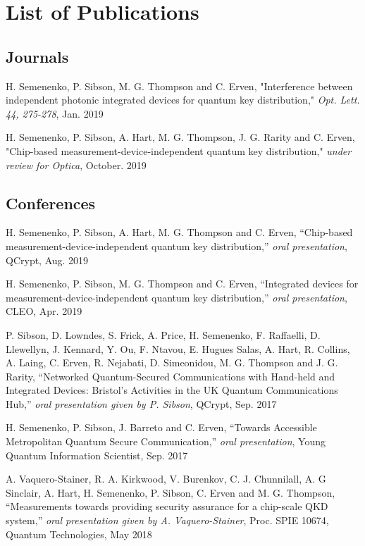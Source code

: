 %
{\setlength{\parindent}{0pt} %
\abnormalparskip{18pt} %
\chapter*{List of Publications}
\section*{Journals}

H. Semenenko, P. Sibson, M. G. Thompson and C. Erven, "Interference between independent photonic integrated devices for quantum key distribution," \textit{Opt. Lett. 44, 275-278}, Jan. 2019 

H. Semenenko, P. Sibson, A. Hart, M. G. Thompson, J. G. Rarity  and C. Erven, "Chip-based measurement-device-independent quantum key distribution," \textit{under review for Optica}, October. 2019 

\section*{Conferences}

H. Semenenko, P. Sibson, A. Hart, M. G. Thompson and C. Erven, ``Chip-based measurement-device-independent quantum key distribution,'' \textit{oral presentation}, QCrypt, Aug. 2019

H. Semenenko, P. Sibson, M. G. Thompson and C. Erven, ``Integrated devices for measurement-device-independent quantum key distribution,'' \textit{oral presentation}, CLEO, Apr. 2019

P. Sibson, D. Lowndes, S. Frick, A. Price, H. Semenenko, F. Raffaelli, D. Llewellyn, J. Kennard, Y. Ou, F. Ntavou, E. Hugues Salas, A. Hart, R. Collins, A. Laing, C. Erven, R. Nejabati, D. Simeonidou, M. G. Thompson and J. G. Rarity, ``Networked Quantum-Secured Communications with Hand-held and Integrated Devices: Bristol’s Activities in the UK Quantum Communications Hub,'' \textit{oral presentation given by P. Sibson}, QCrypt, Sep. 2017

H. Semenenko, P. Sibson, J. Barreto and C. Erven, ``Towards Accessible Metropolitan Quantum Secure Communication,'' \textit{oral presentation}, Young Quantum Information Scientist, Sep. 2017 

A. Vaquero-Stainer, R. A. Kirkwood, V. Burenkov, C. J. Chunnilall, A. G Sinclair, A. Hart, H. Semenenko, P. Sibson, C. Erven and M. G. Thompson, ``Measurements towards providing security assurance for a chip-scale QKD system,'' \textit{oral presentation given by A. Vaquero-Stainer}, Proc. SPIE 10674, Quantum Technologies, May 2018

}
